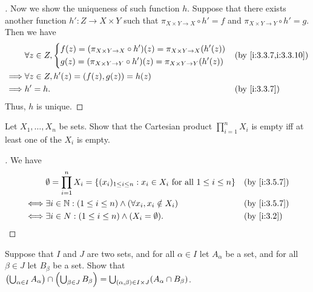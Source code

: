 \begin{proof}[]
  Now we show the uniqueness of such function \(h\).
  Suppose that there exists another function \(h' : Z \to X \times Y\) such that \(\pi_{X \times Y \to X} \circ h' = f\) and \(\pi_{X \times Y \to Y} \circ h' = g\).
  Then we have
  \begin{align*}
             & \forall z \in Z, \begin{dcases}
                                  f(z) = \pa{\pi_{X \times Y \to X} \circ h'}(z) = \pi_{X \times Y \to X}\pa{h'(z)} \\
                                  g(z) = \pa{\pi_{X \times Y \to Y} \circ h'}(z) = \pi_{X \times Y \to Y}\pa{h'(z)}
                                \end{dcases} &  & \by{i:3.3.7,i:3.3.10}     \\
    \implies & \forall z \in Z, h'(z) = (f(z), g(z)) = h(z)                                                            \\
    \implies & h' = h.                                                                               &  & \by{i:3.3.7}
  \end{align*}
  Thus, \(h\) is unique.
\end{proof}

\begin{ex}\label{i:ex:3.5.8}
  Let \(X_1, \dots, X_n\) be sets.
  Show that the Cartesian product \(\prod_{i = 1}^n X_i\) is empty iff at least one of the \(X_i\) is empty.
\end{ex}

\begin{proof}[]
  We have
  \begin{align*}
         & \emptyset = \prod_{i = 1}^n X_i = \set{(x_i)_{1 \leq i \leq n} : x_i \in X_i \text{ for all } 1 \leq i \leq n} &  & \by{i:3.5.7} \\
    \iff & \exists i \in \N : (1 \leq i \leq n) \land (\forall x_i, x_i \notin X_i)                                       &  & \by{i:3.5.7} \\
    \iff & \exists i \in N : (1 \leq i \leq n) \land (X_i = \emptyset).                                                   &  & \by{i:3.2}
  \end{align*}
\end{proof}

\begin{ex}\label{i:ex:3.5.9}
  Suppose that \(I\) and \(J\) are two sets, and for all \(\alpha \in I\) let \(A_\alpha\) be a set, and for all \(\beta \in J\) let \(B_\beta\) be a set.
  Show that \(\left\lparen\bigcup_{\alpha \in I} A_\alpha\right\rparen \cap \left\lparen\bigcup_{\beta \in J} B_\beta\right\rparen = \bigcup_{(\alpha, \beta) \in I \times J} (A_\alpha \cap B_\beta)\).
\end{ex}

